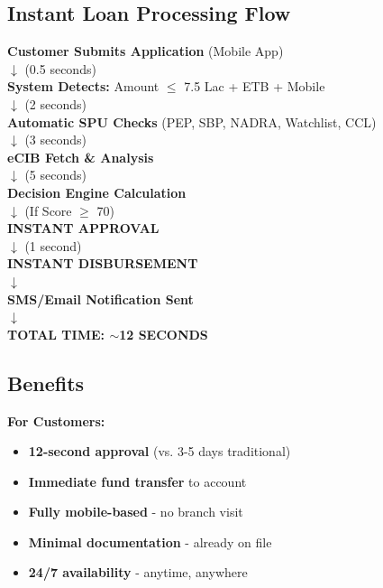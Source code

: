 \documentclass[12pt,a4paper]{article}
\begin{document}
\subsection{Instant Loan Processing Flow}

\begin{tcolorbox}[colback=codecolor,colframe=tealcolor,title=12-Second Processing]
\textbf{Customer Submits Application} (Mobile App) \\
$\downarrow$ (0.5 seconds) \\
\textbf{System Detects:} Amount $\leq$ 7.5 Lac + ETB + Mobile \\
$\downarrow$ (2 seconds) \\
\textbf{Automatic SPU Checks} (PEP, SBP, NADRA, Watchlist, CCL) \\
$\downarrow$ (3 seconds) \\
\textbf{eCIB Fetch \& Analysis} \\
$\downarrow$ (5 seconds) \\
\textbf{Decision Engine Calculation} \\
$\downarrow$ (If Score $\geq$ 70) \\
\textbf{INSTANT APPROVAL} \\
$\downarrow$ (1 second) \\
\textbf{INSTANT DISBURSEMENT} \\
$\downarrow$ \\
\textbf{SMS/Email Notification Sent} \\
$\downarrow$ \\
\textbf{TOTAL TIME: $\sim$12 SECONDS}
\end{tcolorbox}

\subsection{Benefits}

\textbf{For Customers:}
\begin{itemize}
    \item \textbf{12-second approval} (vs. 3-5 days traditional)
    \item \textbf{Immediate fund transfer} to account
    \item \textbf{Fully mobile-based} - no branch visit
    \item \textbf{Minimal documentation} - already on file
    \item \textbf{24/7 availability} - anytime, anywhere
\end{itemize}
\end{document}
